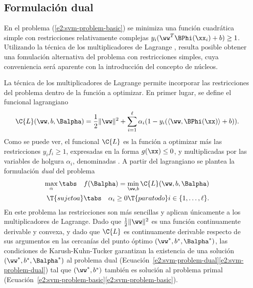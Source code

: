 %
%
\subsection{Formulación dual}
%
En el problema (\ref{e2:svm-problem-basic}) se minimiza una función
cuadrática simple con restricciones relativamente complejas
${y}_i(\ww^T\BPhi(\xx_i)+b)\geq{}1$. Utilizando la técnica de los
multiplicadores de Lagrange \cite{bottou,kuhntucker}, resulta posible
obtener una fomulación alternativa del problema con restricciones
simples, cuya conveniencia será aparente con la introducción del
concepto de núcleos.

La técnica de los multiplicadores de Lagrange permite incorporar las
restricciones del problema dentro de la función a optimizar.  En
primer lugar, se define el funcional lagrangiano
%
\begin{align}\label{e2:lagrangian}
  \C{L}(\ww,b,\Balpha) = \frac{1}{2} \|\ww\|^2 + \sum_{i=1}^{\ell}
  \alpha_i (1-y_i(\langle\ww,\BPhi(\xx)\rangle+b)).
\end{align}
%
Como se puede ver, el funcional $\C{L}$ es la función a optimizar más
las restricciones ${y}_if_i\geq{}1$, expresadas en la forma $g(\xx)\leq0$,
y multiplicadas por las variables de holgura $\alpha_i$,
denominadas . A partir del lagrangiano
se plantea la formulación \emph{dual} del problema
%
\begin{align}\label{e2:svm-problem-dual}
  \begin{split}
    \max_\alpha \tabs\quad f(\Balpha) = \min_{\ww,b} \C{L}(\ww,b,\Balpha)\\
    \T{sujeto a} \tabs\quad \alpha_i \geq 0\T{ para todo } i\in\{1,\ldots,\ell\}.
  \end{split}
\end{align}
%
En este problema las restricciones son más sencillas y
aplican únicamente a los multiplicadores de Lagrange.
Dado que $\frac{1}{2}\|\ww\|^2$ es una función continuamente derivable
y convexa, y dado que $\C{L}$ es continuamente derivable respecto de
sus argumentos en las cercanías del punto óptimo
$(\ww^*,b^*,\Balpha^*)$, las condiciones de Karush-Kuhn-Tucker
\cite{kuhntucker} garantizan la existencia de una solución
$(\ww^*,b^*,\Balpha^*)$ al problema dual
(\iflatexml{}Ecuación~\ref{e2:svm-problem-dual}\else\autoref{e2:svm-problem-dual}\fi)
tal que $(\ww^*,b^*)$ también es solución al problema primal
(\iflatexml{}Ecuación~\ref{e2:svm-problem-basic}\else\autoref{e2:svm-problem-basic}\fi).


